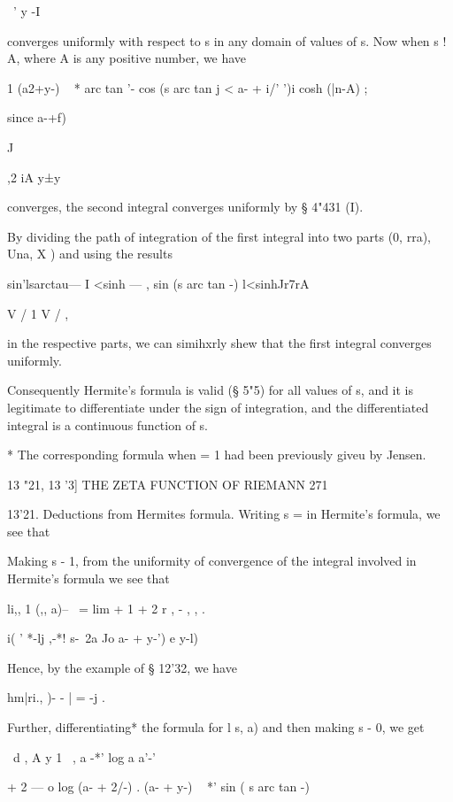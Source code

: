 ~' y -I 



converges uniformly with respect to s in any domain of values of s. Now when s !   A, 
where A is any positive number, we have 

1 (a2+y-) ~ * arc tan '- cos (s arc tan   j <  a- + i/' ')i  cosh (|n-A) ; 

since    a-+f)  

  J 



,2 iA y±y\  



converges, the second integral converges uniformly by § 4"431 (I). 

By dividing the path of integration of the first integral into two parts (0,  rra), 
Una, X ) and using the results 

sin'lsarctau— I <sinh — , sin (s arc tan -) l<sinhJr7rA 

V  / 1   V  / , 

in the respective parts, we can simihxrly shew that the first integral converges uniformly. 

Consequently Hermite's formula is valid (§ 5"5) for all values of s, and 
it is legitimate to differentiate under the sign of integration, and the 
differentiated integral is a continuous function of s. 



* The corresponding formula when   = 1 had been previously giveu by Jensen. 



13 "21, 13 '3] THE ZETA FUNCTION OF RIEMANN 271 

13'21. Deductions from Hermites formula. 
Writing s = in Hermite's formula, we see that 

Making s -  1, from the uniformity of convergence of the integral involved 
in Hermite's formula we see that 

li,, 1 (,, a)-- \ = lim    + 1 + 2 r , - ,  , . 

  i( '   *-lj ,-*! s-\ 2a Jo  a- + y-') e y-l) 

Hence, by the example of § 12'32, we have 

hm|ri., )- - | = -j . 

Further, differentiating* the formula for l  s, a) and then making s -  0, 
we get 

\ d  , A y 1 \   , a -*' log a a'-' 

+ 2 — o log (a- + 2/-) . (a- + y-) ~  *' sin ( s arc tan -) 

